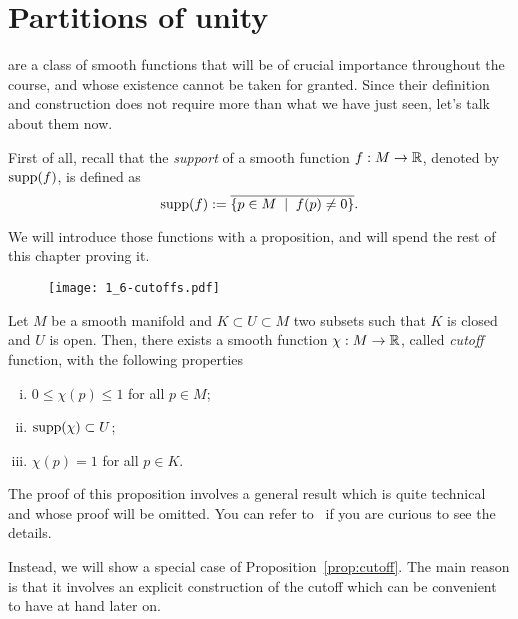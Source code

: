 \section{Partitions of unity}\label{sec:partition_of_unity}

 are a class of smooth functions that will be of crucial importance throughout the course,
and whose existence cannot be taken for granted.
Since their definition and construction does not require more than what we have just seen, let's talk about them now.

First of all, recall that the \emph{support} of a smooth function $f: M \to \mathbb{R}$, denoted by $\operatorname{supp}(f)$, is defined as
\begin{equation}
  \operatorname{supp}(f) := \overline{\{ p\in M \;\mid\; f(p) \neq 0\}}.
\end{equation}

We will introduce those functions with a proposition, and will spend the rest of this chapter proving it.

\begin{figure}[htp!]
  \texttt{[image: 1\_6-cutoffs.pdf]}
\end{figure}

\begin{proposition}\label{prop:cutoff}
  Let $M$ be a smooth manifold and $K\subset U\subset M$ two subsets such that $K$ is closed and $U$ is open.
  Then, there exists a smooth function $\chi: M \to\mathbb{R}$, called \emph{cutoff} function, with the following properties
  \begin{enumerate}[(i)]
    \item $0 \leq \chi(p) \leq 1$ for all $p\in M$;
    \item $\operatorname{supp}(\chi)\subset U$;
    \item $\chi(p) = 1$ for all $p\in K$.
  \end{enumerate}
\end{proposition}

The proof of this proposition involves a general result which is quite technical and whose proof will be omitted.
You can refer to~\cite{book:lee, book:tu} if you are curious to see the details.

Instead, we will show a special case of Proposition~\ref{prop:cutoff}. The main reason is that it involves an explicit construction of the cutoff which can be convenient to have at hand later on.

